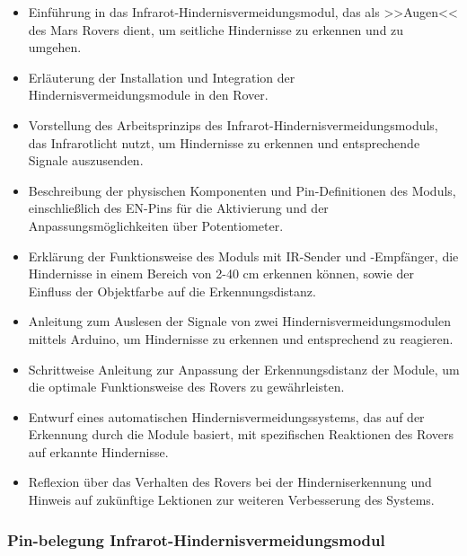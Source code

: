 \documentclass{vorlage-design-main}
\begin{document}
\begin{itemize}

\item
  Einführung in das Infrarot-Hindernisvermeidungsmodul, das als
  >>Augen<< des Mars Rovers dient, um seitliche Hindernisse zu erkennen
  und zu umgehen.
\item
  Erläuterung der Installation und Integration der
  Hindernisvermeidungsmodule in den Rover.
\item
  Vorstellung des Arbeitsprinzips des
  Infrarot-Hindernisvermeidungsmoduls, das Infrarotlicht nutzt, um
  Hindernisse zu erkennen und entsprechende Signale auszusenden.
\item
  Beschreibung der physischen Komponenten und Pin-Definitionen des
  Moduls, einschließlich des EN-Pins für die Aktivierung und der
  Anpassungsmöglichkeiten über Potentiometer.
\item
  Erklärung der Funktionsweise des Moduls mit IR-Sender und -Empfänger,
  die Hindernisse in einem Bereich von 2-40 cm erkennen können, sowie
  der Einfluss der Objektfarbe auf die Erkennungsdistanz.
\item
  Anleitung zum Auslesen der Signale von zwei
  Hindernisvermeidungsmodulen mittels Arduino, um Hindernisse zu
  erkennen und entsprechend zu reagieren.
\item
  Schrittweise Anleitung zur Anpassung der Erkennungsdistanz der Module,
  um die optimale Funktionsweise des Rovers zu gewährleisten.
\item
  Entwurf eines automatischen Hindernisvermeidungssystems, das auf der
  Erkennung durch die Module basiert, mit spezifischen Reaktionen des
  Rovers auf erkannte Hindernisse.
\item
  Reflexion über das Verhalten des Rovers bei der Hinderniserkennung und
  Hinweis auf zukünftige Lektionen zur weiteren Verbesserung des
  Systems.
\end{itemize}

\hypertarget{pin-belegung-infrarot-hindernisvermeidungsmodul}{%
\subsubsection{Pin-belegung
Infrarot-Hindernisvermeidungsmodul}\label{pin-belegung-infrarot-hindernisvermeidungsmodul}}
\end{document}
